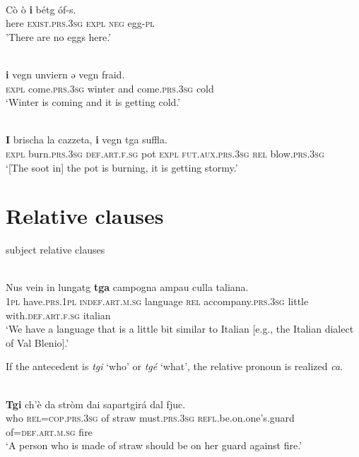 {\ea\label{}
\\ 
\gll Cò ò \textbf{i} bétg óf-s.\\
    here \textsc{exist}.\textsc{prs}.3\textsc{sg} \textsc{expl}  \textsc{neg} egg-\textsc{pl}\\
\glt 'There are no eggs here.'
\z

\ea\label{}
\\
\gll […] \textbf{i} vegn unviern ǝ vegn fraid. \\
     […] \textsc{expl} come.\textsc{prs.3sg} winter and come.\textsc{prs.3sg} cold \\
\glt `Winter is coming and it is getting cold.'
\z

\ea\label{}
\\
\gll \textbf{I} brischa la cazzeta, \textbf{i} vegn tga suffla. \\
   \textsc{expl} burn.\textsc{prs.3sg} \textsc{def.art.f.sg} pot \textsc{expl} \textsc{fut.aux.prs.3sg} \textsc{rel} blow.\textsc{prs.3sg} \\
\glt `[The soot in] the pot is burning, it is getting stormy.'
\z



\section{Relative clauses}

subject relative clauses

\ea\label{}
\\
\gll Nus vein in lungatg \textbf{tga} campogna ampau culla taliana.\\
     \textsc{1pl} have.\textsc{prs.1pl} \textsc{indef.art.m.sg} language \textsc{rel} accompany.\textsc{prs.3sg} little with.\textsc{def.art.f.sg} italian\\
\glt `We have a language that is a little bit similar to Italian [e.g., the Italian dialect of Val Blenio].'
\z

If the antecedent is \textit{tgi} `who' or \textit{tgé} `what', the relative pronoun is realized \textit{ca}.

\ea\label{}
\\
\gll   \textbf{Tgi} {ch}’è da stròm dai sapartgirá dal fjuc.\\
     who \textsc{rel=cop.prs.3sg} of straw must.\textsc{prs.3sg} \textsc{refl}.be.on.one’s.guard of=\textsc{def.art.m.sg} fire\\
\glt `A person who is made of straw should be on her guard against fire.'
\z


}

